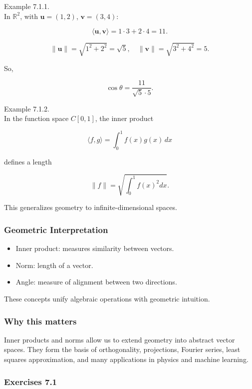 \documentclass[
  12pt,
  a4paper,
]{article}
\begin{document}
Example 7.1.1.\\
In \(\mathbb{R}^2\), with \(\mathbf{u} = (1,2)\),
\(\mathbf{v} = (3,4)\):

\[\langle \mathbf{u}, \mathbf{v} \rangle = 1\cdot 3 + 2\cdot 4 = 11.\]

\[\|\mathbf{u}\| = \sqrt{1^2 + 2^2} = \sqrt{5}, \quad \|\mathbf{v}\| = \sqrt{3^2 + 4^2} = 5.\]

So,

\[\cos \theta = \frac{11}{\sqrt{5}\cdot 5}.\]

Example 7.1.2.\\
In the function space \(C[0,1]\), the inner product

\[\langle f, g \rangle = \int_0^1 f(x) g(x)\, dx\]

defines a length

\[\|f\| = \sqrt{\int_0^1 f(x)^2 dx}.\]

This generalizes geometry to infinite-dimensional spaces.

\subsubsection{Geometric
Interpretation}\label{geometric-interpretation-13}

\begin{itemize}
\item
  Inner product: measures similarity between vectors.
\item
  Norm: length of a vector.
\item
  Angle: measure of alignment between two directions.
\end{itemize}

These concepts unify algebraic operations with geometric intuition.

\subsubsection{Why this matters}\label{why-this-matters-24}

Inner products and norms allow us to extend geometry into abstract
vector spaces. They form the basis of orthogonality, projections,
Fourier series, least squares approximation, and many applications in
physics and machine learning.

\subsubsection{Exercises 7.1}\label{exercises-71}
\end{document}
